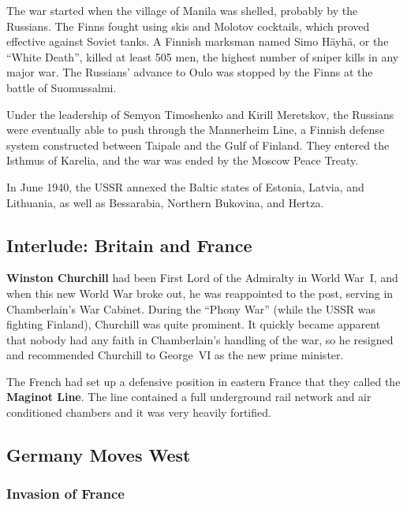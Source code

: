 The war started when the village of Manila was shelled, probably by the Russians.
The Finns fought using skis and Molotov cocktails, which proved effective against Soviet tanks.
A Finnish marksman named Simo H\"ayh\"a, or the ``White Death'', killed at least 505 men,
the highest number of sniper kills in any major war.
The Russians' advance to Oulo was stopped by the Finns at the battle of Suomussalmi.

Under the leadership of Semyon Timoshenko and Kirill Meretskov,
the Russians were eventually able to push through the Mannerheim Line,
a Finnish defense system constructed between Taipale and the Gulf of Finland.
They entered the Isthmus of Karelia, and the war was ended by the Moscow Peace Treaty.

In June 1940, the USSR annexed the Baltic states of Estonia, Latvia, and Lithuania,
as well as Bessarabia, Northern Bukovina, and Hertza.

\subsection*{Interlude: Britain and France}

\textbf{Winston Churchill} had been First Lord of the Admiralty in World War~I,
and when this new World War broke out, he was reappointed to the post, serving in Chamberlain's War Cabinet.
During the ``Phony War'' (while the USSR was fighting Finland), Churchill was quite prominent.
It quickly became apparent that nobody had any faith in Chamberlain's handling of the war,
so he resigned and recommended Churchill to George~VI as the new prime minister.

The French had set up a defensive position in eastern France that they called the \textbf{Maginot Line}.
The line contained a full underground rail network and air conditioned chambers and it was very heavily fortified.

\subsection*{Germany Moves West}

\subsubsection*{Invasion of France}

